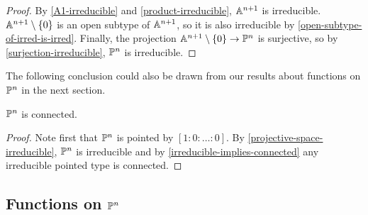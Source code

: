 \begin{proof}
  By \cref{A1-irreducible} and \cref{product-irreducible}, $\mathbb{A}^{n+1}$ is irreducible.
  $\mathbb{A}^{n+1}\setminus\{0\}$ is an open subtype of $\mathbb{A}^{n+1}$,
  so it is also irreducible by \cref{open-subtype-of-irred-is-irred}.
  Finally, the projection $\mathbb{A}^{n+1}\setminus\{0\}\to\mathbb{P}^n$ is surjective,
  so by \cref{surjection-irreducible}, $\mathbb{P}^n$ is irreducible.
\end{proof}

The following conclusion could also be drawn from our results about functions on $\mathbb{P}^n$ in the next section.

\begin{corollary}%
  \label{projective-space-connected}
  $\mathbb{P}^n$ is connected.
\end{corollary}

\begin{proof}
  Note first that $\mathbb{P}^n$ is pointed by $[1:0:\dots:0]$.
  By \cref{projective-space-irreducible}, $\mathbb{P}^n$ is irreducible and
  by \cref{irreducible-implies-connected} any irreducible pointed type is connected.
\end{proof}

\subsection{Functions on $\mathbb{P}^n$}


